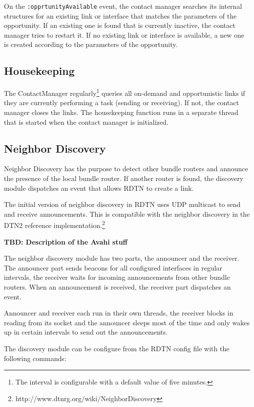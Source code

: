 \documentclass{article}
\begin{document}
On the {\tt :opprtunityAvailable} event, the contact manager searches its
internal structures for an existing link or interface that matches the
parameters of the opportunity. If an existing one is found that is currently
inactive, the contact manager tries to restart it. If no existing link or
interface is available, a new one is created according to the parameters of the
opportunity.

\subsection{Housekeeping}

The ContactManager regularly\footnote{The interval is configurable with a
default value of five minutes.} queries all on-demand and opportunistic links if
they are currently performing a task (sending or receiving). If not, the contact
manager closes the links.  The housekeeping function runs in a separate thread
that is started when the contact manager is initialized.

\subsection{Neighbor Discovery}\label{sec.discovery}

Neighbor Discovery has the purpose to detect other bundle routers and announce
the presence of the local bundle router. If another router is found, the
discovery module dispatches an event that allows RDTN to create a link.

The initial version of neighbor discovery in RDTN uses UDP multicast to send and
receive announcements. This is compatible with the neighbor discovery in the
DTN2 reference
implementation.\footnote{http://www.dtnrg.org/wiki/NeighborDiscovery} 

{\bf TBD: Description of the Avahi stuff}

The neighbor discovery module has two parts, the announcer and the receiver. The
announcer part sends beacons for all configured interfaces in regular intervals,
the receiver waits for incoming announcements from other bundle routers. When an
announcement is received, the receiver part dispatches an event.

Announcer and receiver each run in their own threads, the receiver blocks in
reading from its socket and the announcer sleeps most of the time and
only wakes up in certain intervals to send out the announcements.

The discovery module can be configure from the RDTN config file with the
following commands:
\end{document}
